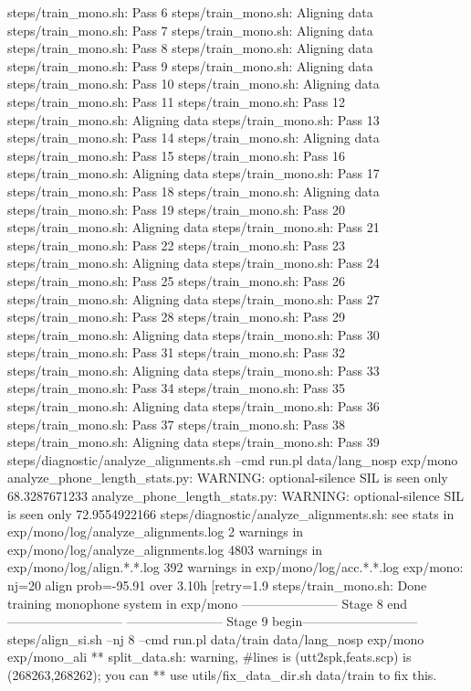 steps/train_mono.sh: Pass 6
steps/train_mono.sh: Aligning data
steps/train_mono.sh: Pass 7
steps/train_mono.sh: Aligning data
steps/train_mono.sh: Pass 8
steps/train_mono.sh: Aligning data
steps/train_mono.sh: Pass 9
steps/train_mono.sh: Aligning data
steps/train_mono.sh: Pass 10
steps/train_mono.sh: Aligning data
steps/train_mono.sh: Pass 11
steps/train_mono.sh: Pass 12
steps/train_mono.sh: Aligning data
steps/train_mono.sh: Pass 13
steps/train_mono.sh: Pass 14
steps/train_mono.sh: Aligning data
steps/train_mono.sh: Pass 15
steps/train_mono.sh: Pass 16
steps/train_mono.sh: Aligning data
steps/train_mono.sh: Pass 17
steps/train_mono.sh: Pass 18
steps/train_mono.sh: Aligning data
steps/train_mono.sh: Pass 19
steps/train_mono.sh: Pass 20
steps/train_mono.sh: Aligning data
steps/train_mono.sh: Pass 21
steps/train_mono.sh: Pass 22
steps/train_mono.sh: Pass 23
steps/train_mono.sh: Aligning data
steps/train_mono.sh: Pass 24
steps/train_mono.sh: Pass 25
steps/train_mono.sh: Pass 26
steps/train_mono.sh: Aligning data
steps/train_mono.sh: Pass 27
steps/train_mono.sh: Pass 28
steps/train_mono.sh: Pass 29
steps/train_mono.sh: Aligning data
steps/train_mono.sh: Pass 30
steps/train_mono.sh: Pass 31
steps/train_mono.sh: Pass 32
steps/train_mono.sh: Aligning data
steps/train_mono.sh: Pass 33
steps/train_mono.sh: Pass 34
steps/train_mono.sh: Pass 35
steps/train_mono.sh: Aligning data
steps/train_mono.sh: Pass 36
steps/train_mono.sh: Pass 37
steps/train_mono.sh: Pass 38
steps/train_mono.sh: Aligning data
steps/train_mono.sh: Pass 39
steps/diagnostic/analyze_alignments.sh --cmd run.pl data/lang_nosp exp/mono
analyze_phone_length_stats.py: WARNING: optional-silence SIL is seen only 68.3287671233%
analyze_phone_length_stats.py: WARNING: optional-silence SIL is seen only 72.9554922166%
steps/diagnostic/analyze_alignments.sh: see stats in exp/mono/log/analyze_alignments.log
2 warnings in exp/mono/log/analyze_alignments.log
4803 warnings in exp/mono/log/align.*.*.log
392 warnings in exp/mono/log/acc.*.*.log
exp/mono: nj=20 align prob=-95.91 over 3.10h [retry=1.9%
steps/train_mono.sh: Done training monophone system in exp/mono
----------------------- Stage 8 end---------------------------
----------------------- Stage 9 begin---------------------------
steps/align_si.sh --nj 8 --cmd run.pl data/train data/lang_nosp exp/mono exp/mono_ali
** split_data.sh: warning, #lines is (utt2spk,feats.scp) is (268263,268262); you can 
**  use utils/fix_data_dir.sh data/train to fix this.
